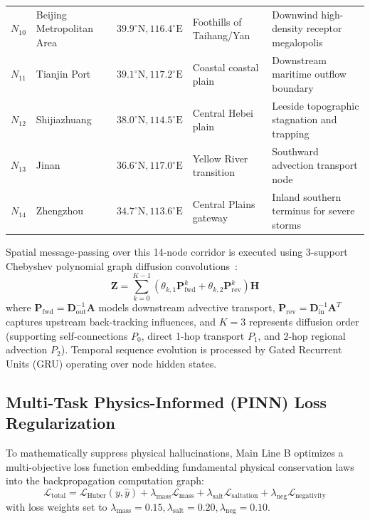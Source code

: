 \begin{table}[H]
\begin{tabularx}{\textwidth}{l l l p{3.2cm} X}
$N_{10}$ & Beijing Metropolitan Area & $39.9^\circ\text{N}, 116.4^\circ\text{E}$ & Foothills of Taihang/Yan & Downwind high-density receptor megalopolis \\
$N_{11}$ & Tianjin Port & $39.1^\circ\text{N}, 117.2^\circ\text{E}$ & Coastal coastal plain & Downstream maritime outflow boundary \\
$N_{12}$ & Shijiazhuang & $38.0^\circ\text{N}, 114.5^\circ\text{E}$ & Central Hebei plain & Leeside topographic stagnation and trapping \\
$N_{13}$ & Jinan & $36.6^\circ\text{N}, 117.0^\circ\text{E}$ & Yellow River transition & Southward advection transport node \\
$N_{14}$ & Zhengzhou & $34.7^\circ\text{N}, 113.6^\circ\text{E}$ & Central Plains gateway & Inland southern terminus for severe storms \\
\bottomrule
\end{tabularx}
\end{table}

Spatial message-passing over this 14-node corridor is executed using 3-support Chebyshev polynomial graph diffusion convolutions~\cite{kipf2017semi}:
\begin{equation}
\label{eq:chebyshev_diffusion}
\mathbf{Z} = \sum_{k=0}^{K-1} \left( \theta_{k, 1} \mathbf{P}_{\text{fwd}}^k + \theta_{k, 2} \mathbf{P}_{\text{rev}}^k \right) \mathbf{H}
\end{equation}
where $\mathbf{P}_{\text{fwd}} = \mathbf{D}_{\text{out}}^{-1} \mathbf{A}$ models downstream advective transport, $\mathbf{P}_{\text{rev}} = \mathbf{D}_{\text{in}}^{-1} \mathbf{A}^T$ captures upstream back-tracking influences, and $K=3$ represents diffusion order (supporting self-connections $P_0$, direct 1-hop transport $P_1$, and 2-hop regional advection $P_2$). Temporal sequence evolution is processed by Gated Recurrent Units (GRU) operating over node hidden states.

\subsection{Multi-Task Physics-Informed (PINN) Loss Regularization}
\label{subsec:pinn_multi_task_loss}

To mathematically suppress physical hallucinations, Main Line B optimizes a multi-objective loss function embedding fundamental physical conservation laws into the backpropagation computation graph:
\begin{equation}
\label{eq:pinn_loss_total}
\mathcal{L}_{\text{total}} = \mathcal{L}_{\text{Huber}}(y, \hat{y}) + \lambda_{\text{mass}} \mathcal{L}_{\text{mass}} + \lambda_{\text{salt}} \mathcal{L}_{\text{saltation}} + \lambda_{\text{neg}} \mathcal{L}_{\text{negativity}}
\end{equation}
with loss weights set to $\lambda_{\text{mass}} = 0.15, \lambda_{\text{salt}} = 0.20, \lambda_{\text{neg}} = 0.10$.

